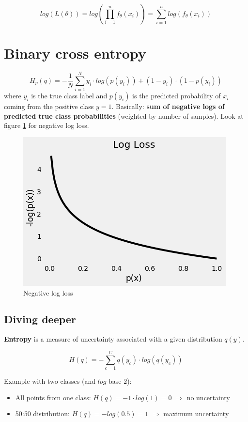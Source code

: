 \documentclass{scrartcl}
\begin{document}
$$log(L(\theta)) = log(\prod_{i=1}^n f_{\theta}(x_i)) = \sum_{i=1}^n log(f_{\theta}(x_i))$$

\section{Binary cross entropy}
$$H_p(q) = -\frac{1}{N} \sum_{i=1}^N y_i \cdot log(p(y_i)) + (1-y_i) \cdot (1-p(y_i))$$
where $y_i$ is the true class label and $p(y_i)$ is the predicted probability of $x_i$ coming from the positive class $y=1$. Basically: \textbf{sum of negative logs of predicted true class probabilities} (weighted by number of samples). Look at figure \ref{fig:binary_cross_neg_log} for negative log loss.

\begin{figure}
	\centering
		\includegraphics[scale=0.7]{img/binary_cross_neg_log}
	\caption{Negative log loss}
	\label{fig:binary_cross_neg_log}
\end{figure}

\subsection{Diving deeper}
\textbf{Entropy} is a measure of uncertainty associated with a given distribution $q(y)$.

$$H(q) = - \sum_{c=1}^C q(y_c) \cdot log(q(y_c))$$

Example with two classes (and $log$ base $2$):
\begin{itemize}
	\item
		All points from one class: $H(q) = - 1 \cdot log(1) = 0$ $\Rightarrow$ no uncertainty
	\item
		50:50 distribution: $H(q) = -log(0.5) = 1$ $\Rightarrow$ maximum uncertainty
\end{itemize}
\end{document}
